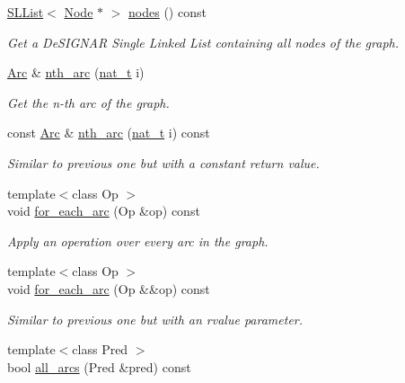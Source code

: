 \begin{DoxyCompactItemize}
\hyperlink{class_designar_1_1_s_l_list}{S\+L\+List}$<$ \hyperlink{namespace_designar_a5af326c65aa2bd26b26c410f2030d09e}{Node} $\ast$ $>$ \hyperlink{class_designar_1_1_base_graph_a56b1ec4a0258d9f22542f33615bcdbea}{nodes} () const
\begin{DoxyCompactList}\small\item\em Get a De\+S\+I\+G\+N\+AR Single Linked List containing all nodes of the graph. \end{DoxyCompactList}\item 
\hyperlink{namespace_designar_a3f55fb5513d62ff47cbc8f72b8e95d6f}{Arc} \& \hyperlink{class_designar_1_1_base_graph_a3fed87a68cc763e63369558423235e00}{nth\+\_\+arc} (\hyperlink{namespace_designar_aa72662848b9f4815e7bf31a7cf3e33d1}{nat\+\_\+t} i)
\begin{DoxyCompactList}\small\item\em Get the n-\/th arc of the graph. \end{DoxyCompactList}\item 
const \hyperlink{namespace_designar_a3f55fb5513d62ff47cbc8f72b8e95d6f}{Arc} \& \hyperlink{class_designar_1_1_base_graph_a2253d6f1e0d163f52ce1b928001e830d}{nth\+\_\+arc} (\hyperlink{namespace_designar_aa72662848b9f4815e7bf31a7cf3e33d1}{nat\+\_\+t} i) const
\begin{DoxyCompactList}\small\item\em Similar to previous one but with a constant return value. \end{DoxyCompactList}\item 
{\footnotesize template$<$class Op $>$ }\\void \hyperlink{class_designar_1_1_base_graph_ac46a1a7517a6c7029c6bae23d480cfa9}{for\+\_\+each\+\_\+arc} (Op \&op) const
\begin{DoxyCompactList}\small\item\em Apply an operation over every arc in the graph. \end{DoxyCompactList}\item 
{\footnotesize template$<$class Op $>$ }\\void \hyperlink{class_designar_1_1_base_graph_ae76905d5baebd62d0fc481efc7c20f66}{for\+\_\+each\+\_\+arc} (Op \&\&op) const
\begin{DoxyCompactList}\small\item\em Similar to previous one but with an rvalue parameter. \end{DoxyCompactList}\item 
{\footnotesize template$<$class Pred $>$ }\\bool \hyperlink{class_designar_1_1_base_graph_a3e2a55dafde6b1edf42f88f4c7d066b8}{all\+\_\+arcs} (Pred \&pred) const

\end{DoxyCompactItemize}
